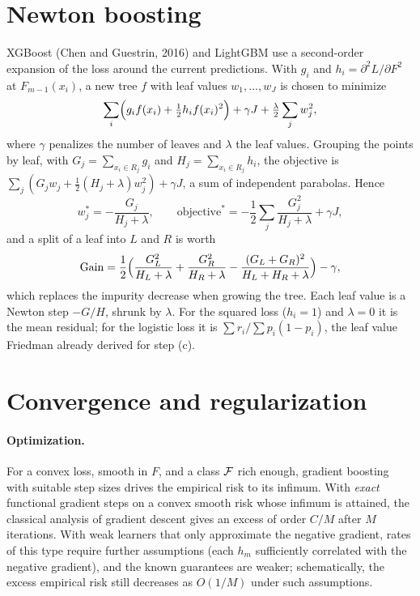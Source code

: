 \begin{notechapter}
\section{Newton boosting}\label{gradient-boosting:sec:newton}

XGBoost (Chen and Guestrin, 2016) and LightGBM use a second-order expansion of the loss
around the current predictions. With $g_i$ and $h_i = \partial^2L/\partial F^2$ at $F_{m-1}(x_i)$, a new tree $f$ with leaf
values $w_1,\dots,w_J$ is chosen to minimize
\[
  \sum_i\Bigl(g_if(x_i) + \tfrac12h_if(x_i)^2\Bigr) + \gamma J + \tfrac\lambda2\sum_jw_j^2,
\]
where $\gamma$ penalizes the number of leaves and $\lambda$ the leaf values. Grouping the points by leaf,
with $G_j = \sum_{x_i\in R_j}g_i$ and $H_j = \sum_{x_i\in R_j}h_i$, the objective is $\sum_j(G_jw_j + \frac12(H_j + \lambda)w_j^2) + \gamma J$, a sum of
independent parabolas. Hence
\[
  w_j^* = -\frac{G_j}{H_j + \lambda},\qquad\text{objective}^* = -\frac12\sum_j\frac{G_j^2}{H_j + \lambda} + \gamma J,
\]
and a split of a leaf into $L$ and $R$ is worth
\[
  \mathrm{Gain} = \frac12\Bigl(\frac{G_L^2}{H_L + \lambda} + \frac{G_R^2}{H_R + \lambda} - \frac{(G_L + G_R)^2}{H_L + H_R + \lambda}\Bigr) - \gamma,
\]
which replaces the impurity decrease when growing the tree. Each leaf value is a Newton
step $-G/H$, shrunk by $\lambda$. For the squared loss ($h_i = 1$) and $\lambda = 0$ it is the mean residual; for
the logistic loss it is $\sum r_i/\sum p_i(1 - p_i)$, the leaf value Friedman already derived for
step (c).

\section{Convergence and regularization}\label{gradient-boosting:sec:theory}

\paragraph{Optimization.} For a convex loss, smooth in $F$, and a class $\mathcal{F}$ rich enough, gradient
boosting with suitable step sizes drives the empirical risk to its infimum. With
\emph{exact} functional gradient steps on a convex smooth risk whose infimum is attained,
the classical analysis of gradient descent gives an excess of order $C/M$ after $M$
iterations. With weak learners that only approximate the negative gradient, rates of
this type require further assumptions (each $h_m$ sufficiently correlated with the negative
gradient), and the known guarantees are weaker; schematically, the excess empirical risk
still decreases as $O(1/M)$ under such assumptions.


\end{notechapter}
